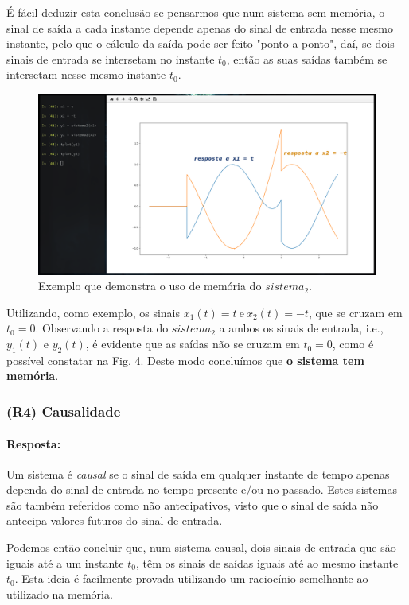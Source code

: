 É fácil deduzir esta conclusão se pensarmos que num sistema sem memória, o sinal de saída a cada instante depende apenas do sinal de entrada nesse mesmo instante, pelo que o cálculo da saída pode ser feito "ponto a ponto", daí, se dois sinais de entrada se intersetam no instante \(t_0\), então as suas saídas também se intersetam nesse mesmo instante \(t_0\).

\clearpage

\begin{figure}[H]
    \centering
    \includegraphics[width = 0.5\linewidth]{prints/memoria.png}
    \caption{Exemplo que demonstra o uso de memória do \(sistema_2\).}
    \label{fig:memory}
\end{figure}

Utilizando, como exemplo, os sinais \(x_1(t) = t\ \text{e}\ x_2(t) = -t\), que se cruzam em \(t_0 = 0\). Observando a resposta do \(sistema_2\) a ambos os sinais de entrada, i.e., \(y_1(t)\) e \(y_2(t)\), é evidente que as saídas não se cruzam em \(t_0 = 0\), como é possível constatar na \hyperref[fig:memory]{Fig. 4}. Deste modo concluímos que \textbf{o sistema tem memória}.
\subsubsection{(R4) Causalidade}
\label{subsubsec:R4}
\paragraph{Resposta:} %
Um sistema é \textit{causal} se o sinal de saída em qualquer instante de tempo apenas dependa do sinal de entrada no tempo presente e/ou no passado. Estes sistemas são também referidos como não antecipativos, visto que o sinal de saída não antecipa valores futuros do sinal de entrada.

Podemos então concluir que, num sistema causal, dois sinais de entrada que são iguais até a um instante \(t_0\), têm os sinais de saídas iguais até ao mesmo instante \(t_0\). Esta ideia é facilmente provada utilizando um raciocínio semelhante ao utilizado na memória.

